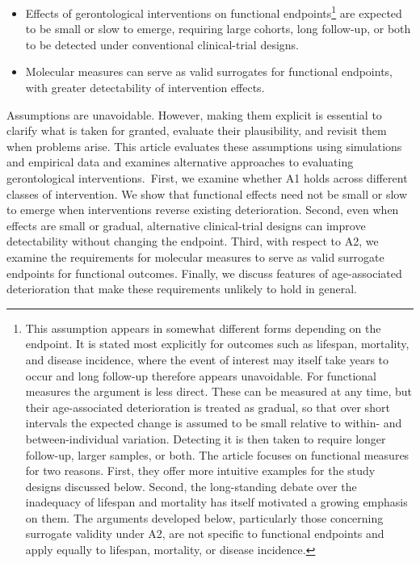 \documentclass[twocolumn]{article} %
\begin{document}
\begin{itemize}
	\item[(\textbf{A1})] Effects of gerontological interventions on functional endpoints\footnote{This assumption appears in somewhat different forms depending on the endpoint. It is stated most explicitly for outcomes such as lifespan, mortality, and disease incidence, where the event of interest may itself take years to occur and long follow-up therefore appears unavoidable\citep[a]{rolland2023challenges}. For functional measures the argument is less direct\citep[b]{rolland2023challenges}. These can be measured at any time, but their age-associated deterioration is treated as gradual, so that over short intervals the expected change is assumed to be small relative to within- and between-individual variation. Detecting it is then taken to require longer follow-up, larger samples, or both. The article focuses on functional measures for two reasons. First, they offer more intuitive examples for the study designs discussed below. Second, the long-standing debate over the inadequacy of lifespan and mortality has itself motivated a growing emphasis on them. The arguments developed below, particularly those concerning surrogate validity under A2, are not specific to functional endpoints and apply equally to lifespan, mortality, or disease incidence.} are expected to be small or slow to emerge, requiring large cohorts, long follow-up, or both to be detected under conventional clinical-trial designs.\citep[c]{kriukov2025we}\citep[e]{waziry2023effect}\cite{moqri2023biomarkers}\citep[b]{rolland2023challenges}\cite[b]{justice2020putting}
	
	\item[(\textbf{A2})] Molecular measures can serve as valid surrogates for functional endpoints, with greater detectability of intervention effects.\citep[c-d]{waziry2023effect}\citep[b]{moqri2023biomarkers}\citep[a]{moqri2024validation}
\end{itemize}

Assumptions are unavoidable. However, making them explicit is essential to clarify what is taken for granted, evaluate their plausibility, and revisit them when problems arise. This article evaluates these assumptions using simulations and empirical data and examines alternative approaches to evaluating gerontological interventions. First, we examine whether A1 holds across different classes of intervention. We show that functional effects need not be small or slow to emerge when interventions reverse existing deterioration. Second, even when effects are small or gradual, alternative clinical-trial designs can improve detectability without changing the endpoint. Third, with respect to A2, we examine the requirements for molecular measures to serve as valid surrogate endpoints for functional outcomes. Finally, we discuss features of age-associated deterioration that make these requirements unlikely to hold in general.
\end{document}
